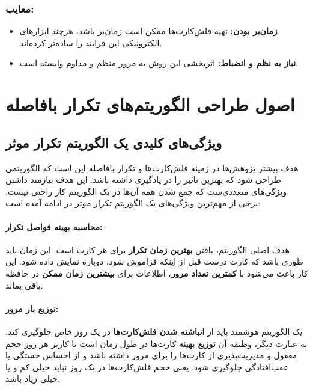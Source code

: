\documentclass[12pt]{report}
\begin{document}
\subsection*{معایب:}
\begin{itemize}
    \item \textbf{زمان‌بر بودن:} تهیه فلش‌کارت‌ها ممکن است زمان‌بر باشد، هرچند ابزارهای الکترونیکی این فرایند را ساده‌تر کرده‌اند.
    \item \textbf{نیاز به نظم و انضباط:} اثربخشی این روش به مرور منظم و مداوم وابسته است.
\end{itemize}

\chapter{اصول طراحی الگوریتم‌های تکرار بافاصله}

\section{ویژگی‌های کلیدی یک الگوریتم تکرار موثر}

هدف بیشتر پژوهش‌ها در زمینه فلش‌کارت‌ها و تکرار بافاصله این است که
الگوریتمی طراحی  شود که بهترین تاثیر را در یادگیری داشته باشد.
این هدف نیازمند داشتن ویژگی‌های متعددی‌ست که جمع شدن همه آن‌ها در یک الگوریتم کار راحتی نیست.
برخی از مهم‌ترین ویژگی‌های یک الگوریتم تکرار موثر در ادامه آمده است:

\subsubsection{محاسبه بهینه فواصل تکرار:} هدف اصلی الگوریتم، یافتن \textbf{بهترین زمان تکرار} برای هر کارت است. این زمان باید طوری باشد که کارت درست قبل از اینکه فراموش شود، دوباره نمایش داده شود. این کار باعث می‌شود با \textbf{کمترین تعداد مرور}، اطلاعات برای \textbf{بیشترین زمان ممکن} در حافظه باقی بماند.

\subsubsection{توزیع بار مرور:} یک الگوریتم هوشمند باید از \textbf{انباشته شدن فلش‌کارت‌ها} در یک روز خاص جلوگیری کند. به عبارت دیگر، وظیفه آن \textbf{توزیع بهینه} کارت‌ها در طول زمان است تا کاربر هر روز حجم معقول و مدیریت‌پذیری از کارت‌ها را برای مرور داشته باشد و از احساس خستگی یا عقب‌افتادگی جلوگیری شود. یعنی حجم فلش‌کارت‌ها در یک روز نباید خیلی کم و یا خیلی زیاد باشد.
\end{document}
